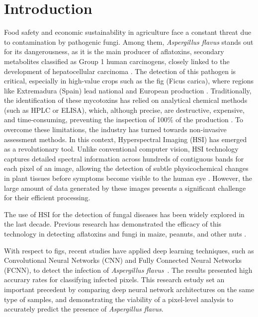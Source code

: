\documentclass[ASNA,twocolumn]{USG}
\begin{document}
\maketitle

\section{Introduction}
Food safety and economic sustainability in agriculture face a constant threat due to contamination by pathogenic fungi. 
Among them, \textit{Aspergillus flavus} stands out for its dangerousness, as it is the main producer of aflatoxins, secondary metabolites classified as Group 1 human carcinogens, closely linked to the development of hepatocellular carcinoma \cite{cruz-carrasco_detection_2024}. 
The detection of this pathogen is critical, especially in high-value crops such as the fig (Ficus carica), where regions like Extremadura (Spain) lead national and European production \cite{cruz-carrasco_detection_2024}. 
Traditionally, the identification of these mycotoxins has relied on analytical chemical methods (such as HPLC or ELISA), which, although precise, are destructive, expensive, and time-consuming, preventing the inspection of 100\% of the production \cite{chu_classifying_2020, park_hyperspectral_2015}. 
To overcome these limitations, the industry has turned towards non-invasive assessment methods. 
In this context, Hyperspectral Imaging (HSI) has emerged as a revolutionary tool. 
Unlike conventional computer vision, HSI technology captures detailed spectral information across hundreds of contiguous bands for each pixel of an image, allowing the detection of subtle physicochemical changes in plant tissues before symptoms become visible to the human eye \cite{wang_review_2021, chu_classifying_2020}. 
However, the large amount of data generated by these images presents a significant challenge for their efficient processing.

The use of HSI for the detection of fungal diseases has been widely explored in the last decade. 
Previous research has demonstrated the efficacy of this technology in detecting aflatoxins and fungi in maize, peanuts, and other nuts \cite{park_hyperspectral_2015, cruz-carrasco_detection_2024}. 

With respect to figs, recent studies have applied deep learning techniques, such as Convolutional Neural Networks (CNN) and Fully Connected Neural Networks (FCNN), to detect the infection of \textit{Aspergillus flavus}~\cite{cruz-carrasco_detection_2024}. The results presented high accurary rates for classifying infected pixels. This research estudy set an important precedent by comparing deep neural network architectures on the same type of samples, and demonstrating the viability of a pixel-level analysis to accurately predict the presence of \textit{Aspergillus flavus}.
\end{document}
